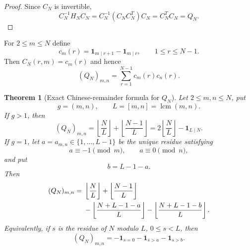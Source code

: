 \documentclass[11pt]{amsart}
\numberwithin{equation}{section}
\theoremstyle{plain}
\newtheorem{theorem}{Theorem}[section]
\theoremstyle{definition}
\theoremstyle{remark}
\begin{document}
\begin{proof}
Since $C_N$ is invertible,
\begin{equation}
C_N^{-1}H_NC_N
=C_N^{-1}(C_NC_N^T)C_N
=C_N^TC_N=Q_N.
\end{equation}
\end{proof}

For $2\le m\le N$ define
\begin{equation}
c_m(r)=\mathbf 1_{m\mid r+1}-\mathbf 1_{m\mid r},
\qquad 1\le r\le N-1.
\label{eq:cmr_definition}
\end{equation}
Then $C_N(r,m)=c_m(r)$ and hence
\begin{equation}
(Q_N)_{m,n}
=\sum_{r=1}^{N-1}c_m(r)c_n(r).
\label{eq:Q_entry_incidence}
\end{equation}

\begin{theorem}[Exact Chinese-remainder formula for $Q_N$]
\label{thm:Q_exact_CRT}
Let $2\le m,n\le N$, put
\begin{equation}
g=(m,n),
\qquad
L=[m,n]=\operatorname{lcm}(m,n).
\end{equation}
If $g>1$, then
\begin{equation}
(Q_N)_{m,n}
=\left\lfloor\frac NL\right\rfloor
 +\left\lfloor\frac{N-1}{L}\right\rfloor
=2\left\lfloor\frac NL\right\rfloor-\mathbf 1_{L\mid N}.
\label{eq:Q_non_coprime_exact}
\end{equation}
If $g=1$, let $a=a_{m,n}\in\{1,\ldots,L-1\}$ be the unique residue satisfying
\begin{equation}
a\equiv-1\pmod m,
\qquad
a\equiv0\pmod n,
\label{eq:a_crt}
\end{equation}
and put
\begin{equation}
b=L-1-a.
\label{eq:b_crt}
\end{equation}
Then
\begin{align}
(Q_N)_{m,n}
={}&\left\lfloor\frac NL\right\rfloor
+\left\lfloor\frac{N-1}{L}\right\rfloor\notag\\
&-\left\lfloor\frac{N+L-1-a}{L}\right\rfloor
-\left\lfloor\frac{N+L-1-b}{L}\right\rfloor.
\label{eq:Q_coprime_floor_exact}
\end{align}
Equivalently, if $s$ is the residue of $N$ modulo $L$, $0\le s<L$, then
\begin{equation}
(Q_N)_{m,n}
=-\mathbf 1_{s=0}-\mathbf 1_{s>a}-\mathbf 1_{s>b}.
\label{eq:Q_coprime_indicator_exact}
\end{equation}
\end{theorem}
\end{document}
